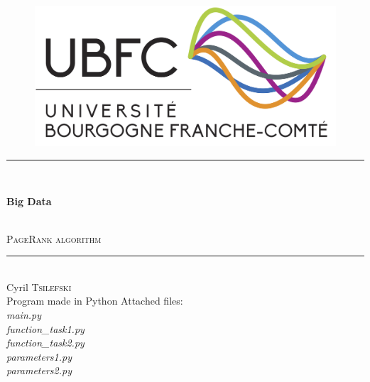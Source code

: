 \thispagestyle{empty}
\setcounter{page}{0}
\begin{center}
    \begin{figure}[!hb]
        \centering
        \includegraphics[width=.7\linewidth]{figures/logo-ubfc.png}
    \end{figure}
    \vspace{7\baselineskip}
    \rule{0.75\textwidth}{1pt}\\
    \vspace{\baselineskip}
    \begin{Huge}\textbf{Big Data}\end{Huge}\\
    \vspace{0.5\baselineskip}
    \Large \textsc{PageRank algorithm} \normalsize \\
    \rule{0.75\textwidth}{1pt}\\
    \vspace{\baselineskip}
    \Large Cyril \textsc{Tsilefski}\\
    \vspace{\baselineskip}
    \vspace{\baselineskip}
    Program made in Python
    \vfill
    Attached files:\\
    \textit{main.py\\
    function\_task1.py\\
    function\_task2.py\\
    parameters1.py\\
    parameters2.py}
    \vfill
\end{center}
\setcounter{figure}{0}
